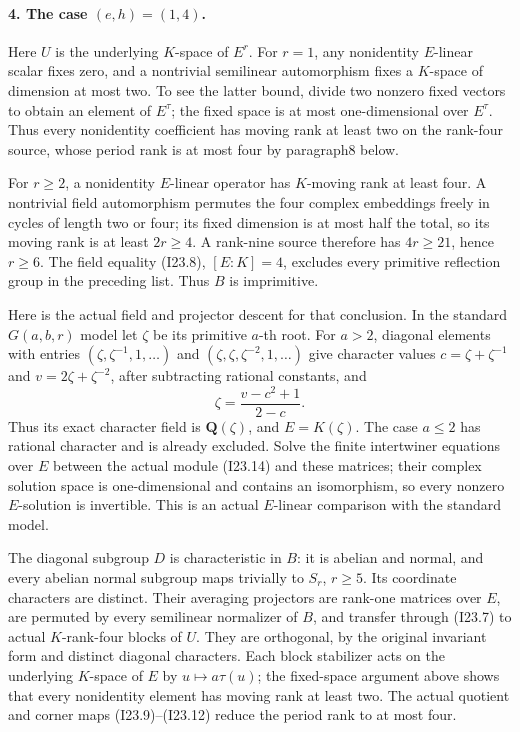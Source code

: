 \paragraph{4. The case \((e,h)=(1,4)\).}
Here \(U\) is the underlying \(K\)-space of \(E^r\).
For \(r=1\), any nonidentity \(E\)-linear scalar fixes zero,
and a nontrivial semilinear automorphism fixes a \(K\)-space
of dimension at most two. To see the latter bound, divide two
nonzero fixed vectors to obtain an element of \(E^\tau\);
the fixed space is at most one-dimensional over \(E^\tau\).
Thus every nonidentity coefficient has moving rank at least two
on the rank-four source, whose period rank is at most four by
paragraph8 below.

For \(r\ge2\), a nonidentity \(E\)-linear operator has
\(K\)-moving rank at least four. A nontrivial field automorphism
permutes the four complex embeddings freely in cycles of length
two or four; its fixed dimension is at most half the total,
so its moving rank is at least \(2r\ge4\). A rank-nine
source therefore has \(4r\ge21\), hence \(r\ge6\).
The field equality (I23.8), \([E:K]=4\), excludes every
primitive reflection group in the preceding list. Thus \(B\)
is imprimitive.

Here is the actual field and projector descent for that conclusion.
In the standard \(G(a,b,r)\) model let \(\zeta\) be its
primitive \(a\)-th root. For \(a>2\), diagonal elements with
entries \((\zeta,\zeta^{-1},1,\ldots)\) and
\((\zeta,\zeta,\zeta^{-2},1,\ldots)\) give character values
\(c=\zeta+\zeta^{-1}\) and \(v=2\zeta+\zeta^{-2}\), after
subtracting rational constants, and
\[
                   \zeta=\frac{v-c^2+1}{2-c}.               \tag{I23.15}
\]
Thus its exact character field is \(\mathbf Q(\zeta)\), and
\(E=K(\zeta)\). The case \(a\le2\) has rational character
and is already excluded. Solve the finite intertwiner equations
over \(E\) between the actual module (I23.14) and these matrices;
their complex solution space is one-dimensional and contains an
isomorphism, so every nonzero \(E\)-solution is invertible.
This is an actual \(E\)-linear comparison with the standard model.

The diagonal subgroup \(D\) is characteristic in \(B\): it
is abelian and normal, and every abelian normal subgroup maps
trivially to \(S_r\), \(r\ge5\). Its coordinate characters
are distinct. Their averaging projectors are rank-one matrices
over \(E\), are permuted by every semilinear normalizer of
\(B\), and transfer through (I23.7) to actual \(K\)-rank-four
blocks of \(U\). They are orthogonal, by the original invariant
form and distinct diagonal characters. Each block stabilizer
acts on the underlying \(K\)-space of \(E\) by
\(u\mapsto a\tau(u)\); the fixed-space argument above shows
that every nonidentity element has moving rank at least two.
The actual quotient and corner maps (I23.9)--(I23.12) reduce
the period rank to at most four.

